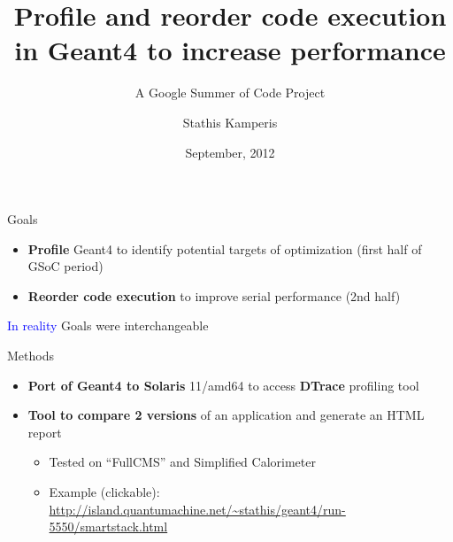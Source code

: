 \documentclass{beamer}
\begin{document}
\title{Profile and reorder code execution in Geant4 to increase performance}
\subtitle{A Google Summer of Code Project}
\author{Stathis Kamperis}
\date{September, 2012}

\begin{frame}[plain]
  \titlepage
\end{frame}

\begin{frame}{Goals}
\begin{itemize}
\item {\bf Profile} Geant4 to identify potential targets of optimization (first half of GSoC period)
\item {\bf Reorder code execution} to improve serial performance (2nd half)
\end{itemize}
\textcolor{blue}{In reality} Goals were interchangeable
\end{frame}

\begin{frame}{Methods}
\begin{itemize}
\item {\bf Port of Geant4 to Solaris} 11/amd64 to access {\bf DTrace} profiling tool
\item {\bf Tool to compare 2 versions} of an application and generate an HTML report
\begin{itemize}
\item Tested on “FullCMS” and Simplified Calorimeter
\item Example (clickable): \url{http://island.quantumachine.net/~stathis/geant4/run-5550/smartstack.html}
\end{itemize}
\end{itemize}
\end{frame}
\end{document}
